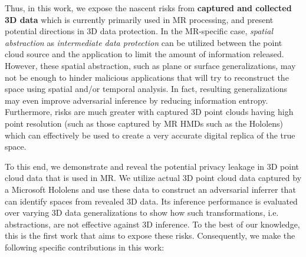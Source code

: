 Thus, in this work, we expose the nascent risks from \textbf{captured and collected 3D data} which is currently primarily used in MR processing, and present potential directions in 3D data protection. In the MR-specific case, \textit{spatial abstraction} as \textit{intermediate data protection} can be utilized between the point cloud source and the application to limit the amount of information released. However, these spatial abstraction, such as plane or surface generalizations, may not be enough to hinder malicious applications that will try to reconstruct the space using spatial and/or temporal analysis. In fact, resulting generalizations may even improve adversarial inference by reducing information entropy. Furthermore, risks are much greater with captured 3D point clouds having high point resolution (such as those captured by MR HMDs such as the Hololens) which can effectively be used to create a very accurate digital replica of the true space. 

To this end, we demonstrate and reveal the potential privacy leakage in 3D point cloud data that is used in MR. We utilize actual 3D point cloud data captured by a Microsoft Hololens and use these data to construct an adversarial inferrer that can identify spaces from revealed 3D data. Its inference performance is evaluated over varying 3D data generalizations to show how such transformations, i.e. abstractions, are not effective against 3D inference. To the best of our knowledge, this is the first work that aims to expose these risks. Consequently, we make the following specific contributions in this work:

